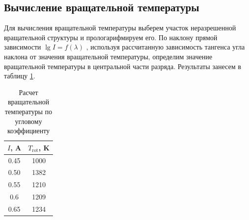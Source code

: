 \subsection{Вычисление вращательной температуры}
Для вычисления вращательной температуры выберем участок неразрешенной
вращательной структуры и прологарифмируем его. По наклону прямой зависимости $\lg I=f(\lambda)$ , используя рассчитанную
зависимость тангенса угла наклона от значения вращательной температуры, определим значение вращательной температуры в центральной части разряда. Результаты занесем в таблицу \ref{tab:T_rot}.

\begin{table}[H]
	\centering
	\caption{Расчет вращательной температуры по угловому коэффициенту}
	\begin{tabular}{|c|c|}
		\hline 
		$I$, A & $T_\text{rot}$, K \\ 
		\hline 
		0.45 & 1000 \\ 
		\hline 
		0.50 & 1382 \\ 
		\hline 
		0.55 & 1210 \\ 
		\hline 
		0.6 & 1209 \\ 
		\hline 
		0.65 & 1234 \\ 
		\hline 
	\end{tabular} 
	\label{tab:T_rot}
\end{table}

